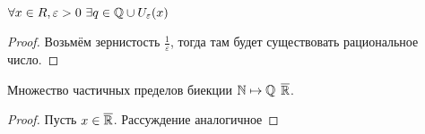 \begin{theorem}
    $\forall x \in R, \varepsilon>0\ \exists q \in \mathbb{Q} \cup U_\varepsilon(x)$
\end{theorem}
\begin{proof}
    Возьмём зернистость $\frac{1}{\varepsilon}$, тогда там будет существовать рациональное число.
\end{proof}

\begin{example}
    Множество частичных пределов биекции $\mathbb{N} \mapsto \mathbb{Q}$ $\overline{\mathbb{R}}$.
\end{example}
\begin{proof}
    Пусть $x \in \overline{\mathbb{R}}$. Рассуждение аналогичное 
\end{proof}

